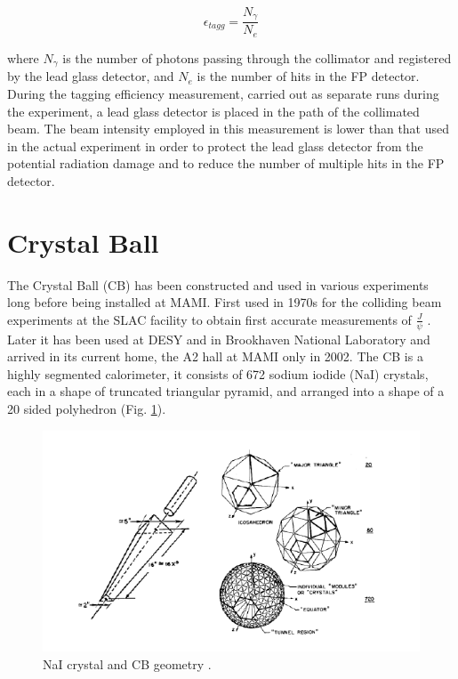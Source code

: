 \begin{equation}
\epsilon_{tagg}=\frac{N_{\gamma}}{N_{e}}
\end{equation}

\indent where $N_{\gamma}$ is the number of photons passing through the collimator and registered by the lead glass detector, and $N_{e}$ is the number of hits in the FP detector. During the tagging efficiency measurement, carried out as separate runs during the experiment, a lead glass detector is placed in the path of the collimated beam. The beam intensity employed in this measurement is lower than that used in the actual experiment in order to protect the lead glass detector from the potential radiation damage and to reduce the number of multiple hits in the FP detector.

\section{Crystal Ball}

\indent The Crystal Ball (CB) has been constructed and used in various experiments long before  being  installed  at  MAMI.  First  used  in  1970s  for  the  colliding  beam experiments at the SLAC facility to obtain first accurate measurements of $\frac{J}{\psi}$ \cite {oreglia}. Later it has been used at DESY and in Brookhaven National Laboratory and arrived in its current home, the A2 hall at MAMI only in 2002. The CB is a highly segmented calorimeter, it consists of 672 sodium iodide (NaI) crystals, each in a shape of truncated triangular pyramid, and arranged into a shape of a 20 sided polyhedron (Fig. \ref{naigeom}).

\begin{figure}[H]
\begin{center}
\includegraphics[scale=0.7]{pictures/png/naigeom.png}
\caption{NaI crystal and CB geometry \cite{a2mami}.}
\label{naigeom}
\end{center}
\end{figure}

